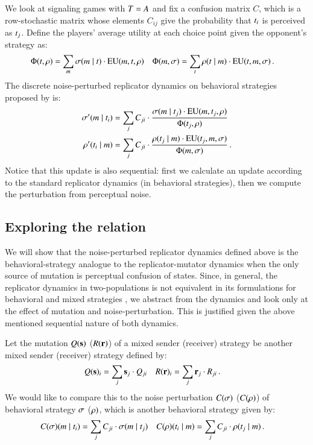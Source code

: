 We look at signaling games with $T = A$ and fix a confusion
matrix $C$, which is a row-stochastic matrix whose elements $C_{ij}$
give the probability that $t_i$ is perceived as
$t_j$. Define the players' average utility at each choice point given
the opponent's strategy as:
\begin{align*}
  \Phi(t,\rho) & = \sum_{m} \sigma(m \mid t) \cdot
\mathrm{EU}(m,t,\rho) &
\Phi(m,\sigma) & = \sum_{t} \rho(t \mid m)
\cdot \mathrm{EU}(t,m,\sigma)\,.
\end{align*}
The discrete noise-perturbed replicator dynamics on behavioral
strategies proposed by \citet{Correia2013:The-Bivalent-Tr} is:
\begin{align*}
  \sigma'(m \mid t_i) & = \sum_{j} C_{ji} \cdot
  \frac{\sigma(m \mid t_j) \cdot
    \mathrm{EU}(m,t_j,\rho)} {\Phi(t_j,\rho)} \\
    \rho'(t_i \mid m) & = \sum_{j} C_{ji} \cdot
  \frac{\rho(t_j \mid m) \cdot
    \mathrm{EU}(t_j,m,\sigma)} {\Phi(m,\sigma)}  \,.
\end{align*}
Notice that this update is also sequential: first we calculate an
update according to the standard replicator dynamics (in behavioral
strategies), then we compute the perturbation from perceptual noise.


\subsection{Exploring the relation}

We will show that the noise-perturbed replicator dynamics defined
above is the behavioral-strategy analogue to the replicator-mutator
dynamics when the only source of mutation is perceptual confusion of
states. Since, in general, the replicator dynamics in two-populations
is not equivalent in its formulations for behavioral and mixed
strategies \citep{Cressman2003:Evolutionary-Dy}, we abstract from the
dynamics and look only at the effect of mutation and
noise-perturbation. This is justified given the above mentioned
sequential nature of both dynamics.

Let the mutation $Q(\mathrm{\mathbf{s}})$ ($R(\mathrm{\mathbf{r}})$) of a mixed sender
(receiver) strategy be another mixed sender (receiver) strategy
defined by:
\begin{align*}
  Q(\mathrm{\mathbf{s}})_i & =  \sum_j  \mathrm{\mathbf{s}}_j \cdot
  Q_{ji} &   R(\mathrm{\mathbf{r}})_i & =  \sum_{j}  \mathrm{\mathbf{r}}_j \cdot
  R_{ji} \,.
\end{align*}
We would like to compare this to the noise perturbation $C(\sigma)$
($C(\rho)$) of behavioral strategy $\sigma$ ($\rho)$, which is
another behavioral strategy given by:
\begin{align*}
  C(\sigma)(m \mid t_i) & = \sum_{j} C_{ji} \cdot
  \sigma(m \mid t_j) & C(\rho)(t_i \mid
  m) & = \sum_{j} C_{ji} \cdot \rho(t_j \mid m)
  \,.
\end{align*}

